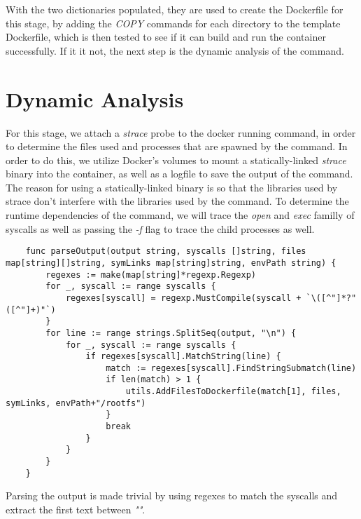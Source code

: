 With the two dictionaries populated, they are used to create the Dockerfile for this stage, by adding the \textit{COPY} commands for each directory to 
the template Dockerfile, which is then tested to see if it can build and run the container successfully. If it it not, the next step is the dynamic analysis of the command.

\section{Dynamic Analysis}


For this stage, we attach a \textit{strace} probe to the docker running command, in order to determine the files used and processes that are spawned by the command.
In order to do this, we utilize Docker's volumes to mount a statically-linked \textit{strace} binary into the container, as well as a logfile to save the output of the command.
The reason for using a statically-linked binary is so that the libraries used by strace don't interfere with the libraries used by the command.
To determine the runtime dependencies of the command, we will trace the \textit{open} and \textit{exec} familly of syscalls \cite{identify-dependencies} as well as passing the \textit{-f} flag
to trace the child processes as well.

\lstset{language=Go,caption=Strace output parser,label=lst:strace-parser}
\begin{lstlisting}
    func parseOutput(output string, syscalls []string, files map[string][]string, symLinks map[string]string, envPath string) {
        regexes := make(map[string]*regexp.Regexp)
        for _, syscall := range syscalls {
            regexes[syscall] = regexp.MustCompile(syscall + `\([^"]*?"([^"]+)"`)
        }
        for line := range strings.SplitSeq(output, "\n") {
            for _, syscall := range syscalls {
                if regexes[syscall].MatchString(line) {
                    match := regexes[syscall].FindStringSubmatch(line)
                    if len(match) > 1 {
                        utils.AddFilesToDockerfile(match[1], files, symLinks, envPath+"/rootfs")
                    }
                    break
                }
            }
        }
    }
\end{lstlisting}

Parsing the output is made trivial by using regexes to match the syscalls and extract the first text between \textit{""}.

